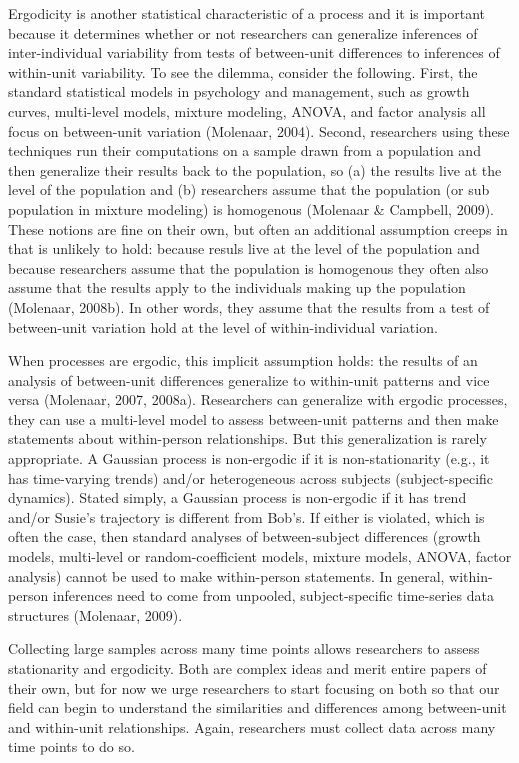\documentclass[english,,man]{apa6}
\theoremstyle{definition}
\theoremstyle{definition}
\theoremstyle{definition}
\theoremstyle{remark}
\begin{document}
Ergodicity is another statistical characteristic of a process and it is
important because it determines whether or not researchers can
generalize inferences of inter-individual variability from tests of
between-unit differences to inferences of within-unit variability. To
see the dilemma, consider the following. First, the standard statistical
models in psychology and management, such as growth curves, multi-level
models, mixture modeling, ANOVA, and factor analysis all focus on
between-unit variation (Molenaar, 2004). Second, researchers using these
techniques run their computations on a sample drawn from a population
and then generalize their results back to the population, so (a) the
results live at the level of the population and (b) researchers assume
that the population (or sub population in mixture modeling) is
homogenous (Molenaar \& Campbell, 2009). These notions are fine on their
own, but often an additional assumption creeps in that is unlikely to
hold: because resuls live at the level of the population and because
researchers assume that the population is homogenous they often also
assume that the results apply to the individuals making up the
population (Molenaar, 2008b). In other words, they assume that the
results from a test of between-unit variation hold at the level of
within-individual variation.

When processes are ergodic, this implicit assumption holds: the results
of an analysis of between-unit differences generalize to within-unit
patterns and vice versa (Molenaar, 2007, 2008a). Researchers can
generalize with ergodic processes, they can use a multi-level model to
assess between-unit patterns and then make statements about
within-person relationships. But this generalization is rarely
appropriate. A Gaussian process is non-ergodic if it is non-stationarity
(e.g., it has time-varying trends) and/or heterogeneous across subjects
(subject-specific dynamics). Stated simply, a Gaussian process is
non-ergodic if it has trend and/or Susie's trajectory is different from
Bob's. If either is violated, which is often the case, then standard
analyses of between-subject differences (growth models, multi-level or
random-coefficient models, mixture models, ANOVA, factor analysis)
cannot be used to make within-person statements. In general,
within-person inferences need to come from unpooled, subject-specific
time-series data structures (Molenaar, 2009).

Collecting large samples across many time points allows researchers to
assess stationarity and ergodicity. Both are complex ideas and merit
entire papers of their own, but for now we urge researchers to start
focusing on both so that our field can begin to understand the
similarities and differences among between-unit and within-unit
relationships. Again, researchers must collect data across many time
points to do so.
\end{document}
